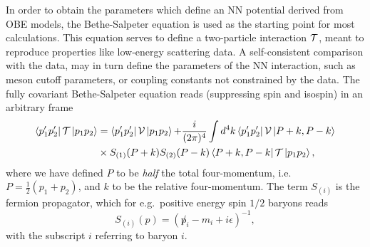 In order to obtain the parameters which define an
NN potential derived from OBE models,
the Bethe-Salpeter equation is used as 
the starting point for most calculations.
This equation serves to define a
two-particle interaction
${\cal T}$, meant to reproduce 
properties like low-energy scattering data.
A self-consistent comparison with the data, may in turn define
the parameters
of the NN interaction, such as meson cutoff parameters, or coupling
constants not constrained by the data.  The fully covariant
Bethe-Salpeter equation
reads (suppressing spin and isospin) in an arbitrary frame
\begin{eqnarray}
   \label{eq:bs4dim}
   \left\langle p_1'p_2' \right|{\cal T}\left| p_1p_2 \right\rangle&=
   \left\langle p_1'p_2' \right|{\cal V}\left| p_1p_2 \right\rangle
   {\displaystyle +\frac{i}{(2\pi )^4} \int d^4 k}
   \left\langle p_1'p_2' \right| {\cal V} \left|  P+k,P-k \right\rangle\\ \nonumber
   & \times  S_{(1)}(P+k)S_{(2)}(P-k)
   \left\langle P+k,P-k \right|{\cal T}\left| p_1p_2 \right\rangle,
\end{eqnarray}
where we have defined $P$ to be {\em half} the total four-momentum,
i.e. $P=\frac{1}{2}(p_1 +p_2)$, and
$k$ to be the relative four-momentum. The term $S_{(i)}$
is the fermion propagator, which for e.g.\ positive energy spin $1/2$ baryons
reads
\begin{equation}
  S_{(i)}(p) = \left(\not p_i -m_i +i\epsilon\right)^{-1},
\end{equation}
with the subscript $i$
referring to baryon $i$.

